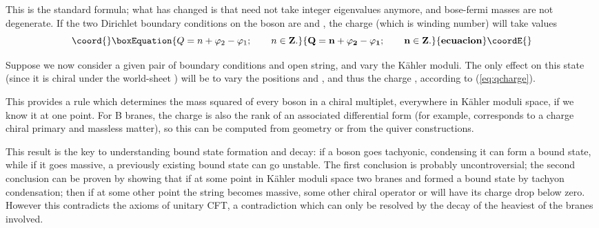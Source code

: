 \documentclass[a4paper,12pt]{amsart}
\numberwithin{equation}{section}
\theoremstyle{plain}
\theoremstyle{definition}
\def\Bbb#1{{\fam\black\relax#1}}
\def\Bbb{\bf}
\def\grade{\varphi}
\def\cal{\mathcal}
\def\BZ{\Bbb{Z}}
\def\CN{{\cal N}}
\begin{document}
This is the standard formula; what has changed is that \coordHE{} need not
take integer eigenvalues anymore, and bose-fermi masses are not degenerate.
If the two Dirichlet boundary conditions
on the boson are \myHighlight{$\grade_1$}\coordHE{} and \myHighlight{$\grade_2$}\coordHE{}, the \coordHE{} charge (which is
winding number) will take values 
\begin{equation}\coord{}\boxEquation{ \label{eq:qcharge}
Q = n+\grade_2-\grade_1; \qquad n\in\BZ.
}{ Q = n+\grade_2-\grade_1; \qquad n\in\BZ.
}{ecuacion}\coordE{}\end{equation}

Suppose we now consider a given pair of boundary conditions and open
string, and vary the K\"ahler moduli.  The only effect on this state
(since it is chiral under the world-sheet \myHighlight{$\CN=2$}\coordHE{}) will be to vary
the positions \myHighlight{$\grade_1$}\coordHE{} and \myHighlight{$\grade_2$}\coordHE{}, and thus the \coordHE{} charge \coordHE{},
according to (\ref{eq:qcharge}).  

This provides a rule which determines the mass squared of every boson
in a chiral multiplet, everywhere in K\"ahler moduli space, if we know
it at one point.  For B branes, the \coordHE{} charge \coordHE{} is also the rank
of an associated differential form (for example, \coordHE{}
corresponds to a charge \coordHE{} chiral primary and massless matter), so this
can be computed from geometry or from the quiver constructions.

This result is the key to understanding bound state formation and
decay: if a boson goes tachyonic, condensing it can form a bound
state, while if it goes massive, a previously existing bound state can
go unstable.  The first conclusion is probably uncontroversial; the
second conclusion can be proven by showing that if at some point in
K\"ahler moduli space two branes \coordHE{} and \coordHE{} formed a bound state \coordHE{}
by tachyon condensation; then if at some other point the string
\coordHE{} becomes massive, some other chiral operator
\coordHE{} or \coordHE{} will have its \coordHE{} charge
drop below zero.  However this contradicts the axioms of unitary CFT,
a contradiction which can only be resolved by the decay of the heaviest
of the branes involved.
\end{document}
